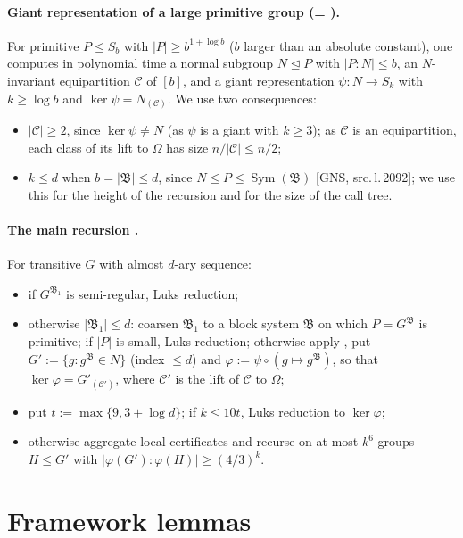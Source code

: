 \documentclass[11pt]{article}
\theoremstyle{plain}
\theoremstyle{definition}
\theoremstyle{remark}
\theoremstyle{named}
\theoremstyle{namedrm}
\newcommand{\Sym}{\operatorname{Sym}}
\newcommand{\fB}{\mathfrak{B}}
\newcommand{\cC}{\mathcal{C}}
\newcommand{\Cp}{\mathcal{C}'}
\newcommand{\src}[2]{[#1, src.\,l.\,#2]}
\begin{document}
\paragraph{Giant representation of a large primitive group \cite[Lemma~7.1]{GNS}
(= \cite[Thm.~3.2.1]{Bab15}).} For primitive $P\le S_b$ with $|P|\ge b^{1+\log b}$ ($b$ larger than an
absolute constant), one computes in polynomial time a normal subgroup $N\trianglelefteq P$ with
$|P:N|\le b$, an $N$-invariant equipartition $\cC$ of $[b]$, and a giant representation
$\psi\colon N\to S_k$ with $k\ge\log b$ and $\ker\psi=N_{(\cC)}$. We use two consequences:
\begin{itemize}
\item $|\cC|\ge2$, since $\ker\psi\neq N$ (as $\psi$ is a giant with $k\ge3$); as $\cC$ is an equipartition,
  each class of its lift to $\Omega$ has size $n/|\cC|\le n/2$;
\item $k\le d$ when $b=|\fB|\le d$, since $N\le P\le\Sym(\fB)$ \src{GNS}{2092}; we use this for the height
  of the recursion and for the size of the call tree.
\end{itemize}

\paragraph{The main recursion \cite[Lemma~7.2, Alg.~4]{GNS}.} For transitive $G$ with almost $d$-ary
sequence:
\begin{itemize}
\item if $G^{\fB_1}$ is semi-regular, Luks reduction;
\item otherwise $|\fB_1|\le d$: coarsen $\fB_1$ to a block system $\fB$ on which $P=G^{\fB}$ is primitive;
  if $|P|$ is small, Luks reduction; otherwise apply \cite[Lemma~7.1]{GNS}, put
  $G':=\{g:g^{\fB}\in N\}$ (index $\le d$) and $\varphi:=\psi\circ(g\mapsto g^{\fB})$, so that
  $\ker\varphi=G'_{(\Cp)}$, where $\Cp$ is the lift of $\cC$ to $\Omega$;
\item put $t:=\max\{9,3+\log d\}$; if $k\le10t$, Luks reduction to $\ker\varphi$;
\item otherwise aggregate local certificates and recurse on at most $k^6$ groups $H\le G'$ with
  $|\varphi(G'):\varphi(H)|\ge(4/3)^k$.
\end{itemize}

\section{Framework lemmas}\label{sec:framework}
\end{document}
